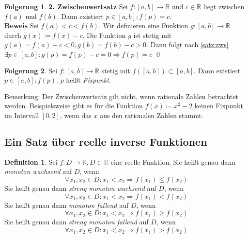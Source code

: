 \documentclass[ngerman,titlepage,twoside, parskip=half*]{scrreprt}
\newcommand*{\R}{\mathbb{R}}
\theoremstyle{plain}
\theoremstyle{definition}
\newtheorem{definition}{Definition}
\newtheorem{Folg}{Folgerung}
\theoremstyle{remark}
\begin{document}
\begin{Folg}
\textbf{2. Zwischenwertsatz} Sei $f\colon[a,b]\rightarrow\R$ und $c\in \R$ liegt zwischen $f(a)$ und $f(b)$. Dann existiert
$p\in[a,b]\colon f(p)=c$.\\
\textbf{Beweis} Sei $f(a)<c<f(b)$. Wir definieren eine Funktion
  $g\colon[a,b]\rightarrow \R$ durch $g(x)\coloneqq f(x)-c$. Die
Funktion $g$ ist stetig mit $g(a)=f(a)-c<0, g(b)=f(b)-c>0$. Dann folgt nach \autoref{satz:zws} $\exists p\in[a,b]
\colon g(p)=f(p)-c=0\Rightarrow f(p)=c$
\qed
\end{Folg}

\begin{Folg}
Sei $f\colon[a,b]\rightarrow\R$ stetig mit $f([a,b])\subset [a,b]$. Dann existiert $p\in [a,b]\colon f(p)$. $p$ heißt
\emph{Fixpunkt}.
\end{Folg}

Bemerkung: Der Zwischenwertsatz gilt nicht, wenn rationale Zahlen betrachtet werden. Beispielsweise gibt es für
die Funktion $f(x)\coloneqq x^2-2$ keinen Fixpunkt im Intervall $[0,2]$, wenn das $x$ aus den rationalen Zahlen stammt.

\subsection{Ein Satz über reelle inverse Funktionen}
\begin{definition}
Sei $f\colon D\rightarrow\R, D\subset \R$ eine reelle Funktion. Sie heißt genau dann \emph{monoton wachsend} auf $D$, wenn
\[\forall x_1,x_2\in D\colon x_1<x_2\Rightarrow f(x_1)\leq f(x_2)\]
Sie heißt genau dann \emph{streng monoton wachsend} auf $D$, wenn
\[\forall x_1,x_2\in D\colon x_1<x_2\Rightarrow f(x_1)<f(x_2)\]
Sie heißt genau dann \emph{monoton fallend} auf $D$, wenn
\[\forall x_1,x_2\in D\colon x_1<x_2\Rightarrow f(x_1)\geq f(x_2)\]
Sie heißt genau dann \emph{streng monoton fallend} auf $D$, wenn
\[\forall x_1,x_2\in D\colon x_1<x_2\Rightarrow f(x_1)>f(x_2)\]
\end{definition}
\end{document}
